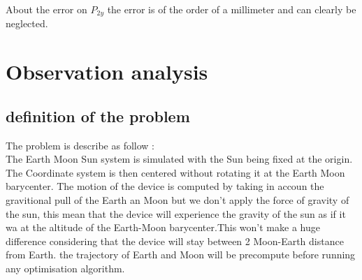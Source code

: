 \documentclass{article} %
\begin{document}
		About the error on $P_{2y}$ the error is of the order of a millimeter and can clearly be neglected.
		
		
		
		
		
		
		\newpage
		\section{Observation analysis}
		
		\subsection{definition of the problem}
		
		The problem is describe as follow :
		\\
		The Earth Moon Sun system is simulated with the Sun being fixed at the origin. The Coordinate system is then centered without rotating it at the Earth Moon barycenter. The motion of the device is computed by taking in accoun the gravitional pull of the Earth an Moon but we don't apply the force of gravity of the sun, this mean that the device will experience the gravity of the sun as if it wa at the altitude of the Earth-Moon barycenter.This won't make a huge difference considering that the device will stay between 2 Moon-Earth distance from Earth. the trajectory of Earth and Moon will be precompute before running any optimisation algorithm.
		
\end{document}

